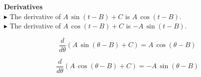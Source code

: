 \documentclass{ximera}
\begin{document}
\begin{theorem} \textbf{\textcolor{green!50!black}{Derivatives}}  \\

$\blacktriangleright$ The derivative of \textbf{\textcolor{purple!85!blue}{$A \, \sin(t - B) + C$}} is \textbf{\textcolor{blue!55!black}{$A \, \cos(t - B)$}}. \\

$\blacktriangleright$ The derivative of \textbf{\textcolor{purple!85!blue}{$A \, \cos(t - B) + C$}} is \textbf{\textcolor{blue!55!black}{$-A \, \sin(t - B)$}}. \\

\end{theorem}






\begin{notation}

\[
\frac{d}{d\theta} (A \, \sin(\theta - B) + C) = A \, \cos(\theta - B)
\]

\[
\frac{d}{d\theta} (A \, \cos(\theta - B) + C) = -A \, \sin(\theta - B)
\]

\end{notation}
\end{document}
